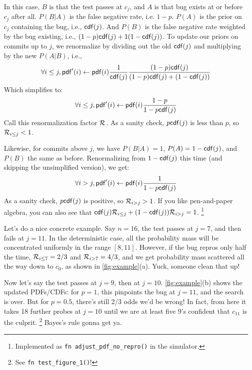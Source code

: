 \documentclass[11pt]{sigplanconf}
\begin{document}
In this case, $B$ is that the test passes at $c_j$, and $A$ is that bug exists at or before $c_j$ after all.
$P(B|A)$ is the false negative rate, i.e. $1-p$.
$P(A)$ is the prior on $c_j$ containing the bug, i.e., $\mathsf{cdf}(j)$.
And $P(B)$ is the false negative rate weighted by the bug existing, i.e., $(1-p)\mathsf{cdf}(j) + 1(1-\mathsf{cdf}(j))$.
To update our priors on commits up to $j$, we renormalize by dividing out the old $\mathsf{cdf}(j)$
and multiplying by the new $P(A|B)$, i.e.,
\[
	\forall i \le j, \mathsf{pdf}'(i)
	\leftarrow
	\mathsf{pdf}(i)
	\frac{1}{\mathsf{cdf}(j)}
	\frac{(1-p)\mathsf{cdf}(j)}{(1-p)\mathsf{cdf}(j) + (1-\mathsf{cdf}(j))}
\]
Which simplifies to:
\[
	\forall i \le j, \mathsf{pdf}'(i)
	\leftarrow
	\mathsf{pdf}(i)
	\frac{1-p}{1 - p\mathsf{cdf}(j)}
\]
Call this renormalization factor $\mathcal{R}_{}$.
As a sanity check, $p\mathsf{cdf}(j)$ is less than $p$, so $\mathcal{R}_{i\le j} < 1$.

Likewise, for commits above $j$, we have $P(B|A) = 1$, $P(A) = 1-\mathsf{cdf}(j)$, and $P(B)$ the same as before.
Renormalizing from $1-\mathsf{cdf}(j)$ this time (and skipping the unsimplified version), we get:
\[
	\forall i > j, \mathsf{pdf}'(i)
	\leftarrow
	\mathsf{pdf}(i)
	\frac{1}{1 - p\mathsf{cdf}(j)}
\]
As a sanity check, $p\mathsf{cdf}(j)$ is positive, so $\mathcal{R}_{i > j} > 1$.
If you like pen-and-paper algebra, you can also see that
$
\mathsf{cdf}(j)
\mathcal{R}_{i \le j}
+
(1-\mathsf{cdf}(j))
\mathcal{R}_{i>j}
= 1$.%
\footnote{Implemented as {\tt fn adjust\_pdf\_no\_repro()} in the simulator.}


Let's do a nice concrete example.
Say $n=16$, the test passes at $j=7$, and then fails at $j=11$.
In the deterministic case, all the probability mass will be concentrated uniformly in the range $[8,11]$.
However, if the bug repros only half the time,
$\mathcal{R}_{i \le 7} = 2/3$
and
$\mathcal{R}_{i > 7} = 4/3$,
and we get probability mass scattered all the way down to $c_0$,
as shown in \cref{fig:example}(a).
Yuck, someone clean that up!

Now let's say the test passes at $j=9$, then at $j=10$.
\cref{fig:example}(b) shows the updated PDFs/CDFs:
for $p=1$, this pinpoints the bug at $j=11$, and the search is over.
But for $p=0.5$, there's still 2/3 odds we'd be wrong!
In fact, from here it takes 18 further probes at $j=10$ until we are at least five 9's confident that $c_{11}$ is the culprit.%
\footnote{See {\tt fn test\_figure\_1()}!}
Bayes's rule gonna get ya.
\end{document}
